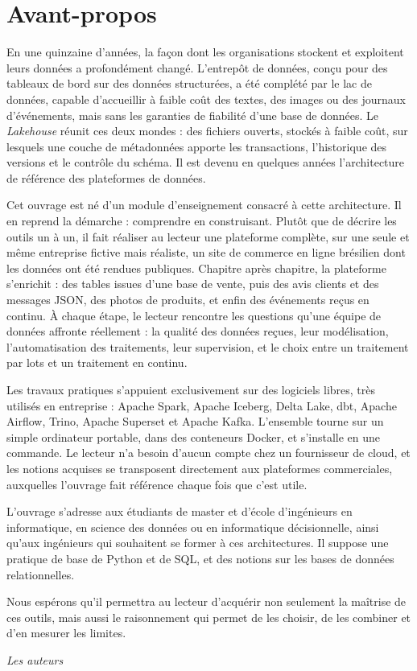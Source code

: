 \chapter*{Avant-propos}

En une quinzaine d'années, la façon dont les organisations stockent et exploitent leurs données a
profondément changé. L'entrepôt de données, conçu pour des tableaux de bord sur des données
structurées, a été complété par le lac de données, capable d'accueillir à faible coût des textes,
des images ou des journaux d'événements, mais sans les garanties de fiabilité d'une base de
données. Le \emph{Lakehouse} réunit ces deux mondes : des fichiers ouverts, stockés à faible coût,
sur lesquels une couche de métadonnées apporte les transactions, l'historique des versions et le
contrôle du schéma. Il est devenu en quelques années l'architecture de référence des plateformes de
données.

Cet ouvrage est né d'un module d'enseignement consacré à cette architecture. Il en reprend la
démarche : comprendre en construisant. Plutôt que de décrire les outils un à un, il fait réaliser au
lecteur une plateforme complète, sur une seule et même entreprise fictive mais réaliste, un site de
commerce en ligne brésilien dont les données ont été rendues publiques. Chapitre après chapitre, la
plateforme s'enrichit : des tables issues d'une base de vente, puis des avis clients et des messages
JSON, des photos de produits, et enfin des événements reçus en continu. À chaque étape, le lecteur
rencontre les questions qu'une équipe de données affronte réellement : la qualité des données
reçues, leur modélisation, l'automatisation des traitements, leur supervision, et le choix entre un
traitement par lots et un traitement en continu.

Les travaux pratiques s'appuient exclusivement sur des logiciels libres, très utilisés en
entreprise : Apache Spark, Apache Iceberg, Delta Lake, dbt, Apache Airflow, Trino, Apache Superset et
Apache Kafka. L'ensemble tourne sur un simple ordinateur portable, dans des conteneurs Docker, et
s'installe en une commande. Le lecteur n'a besoin d'aucun compte chez un fournisseur de cloud, et
les notions acquises se transposent directement aux plateformes commerciales, auxquelles l'ouvrage
fait référence chaque fois que c'est utile.

L'ouvrage s'adresse aux étudiants de master et d'école d'ingénieurs en informatique, en science des
données ou en informatique décisionnelle, ainsi qu'aux ingénieurs qui souhaitent se former à ces
architectures. Il suppose une pratique de base de Python et de SQL, et des notions sur les bases de
données relationnelles.

Nous espérons qu'il permettra au lecteur d'acquérir non seulement la maîtrise de ces outils, mais
aussi le raisonnement qui permet de les choisir, de les combiner et d'en mesurer les limites.

\bigskip
\hfill\textit{Les auteurs}
